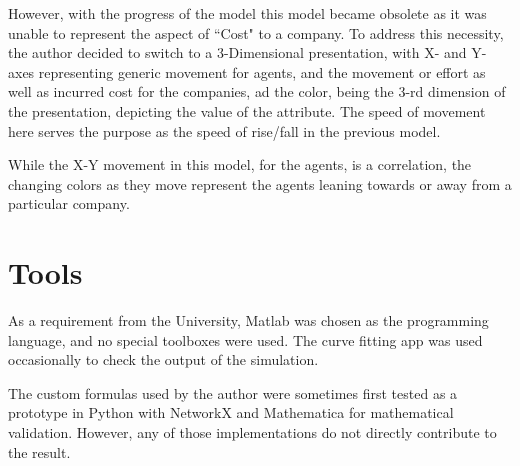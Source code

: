 However, with the progress of the model this model became obsolete as it was unable to represent the aspect of ``Cost" to a company. 
To address this necessity, the author decided to switch to a 3-Dimensional presentation, with X- and Y- axes representing generic movement for agents, and the movement or effort as well as incurred cost for the companies, ad the color, being the 3-rd dimension of the presentation, depicting the value of the attribute. The speed of movement here serves the purpose as the speed of rise/fall in the previous model.

While the X-Y movement in this model, for the agents, is a correlation, the changing colors as they move represent the agents leaning towards or away from a particular company.




\section{Tools}
As a requirement from the University, Matlab was chosen as the programming language, and no special toolboxes were used.
The curve fitting app was used occasionally to check the output of the simulation.

The custom formulas used by the author were sometimes first tested as a prototype in Python with NetworkX and Mathematica for mathematical validation. However, any of those implementations do not directly contribute to the result.
